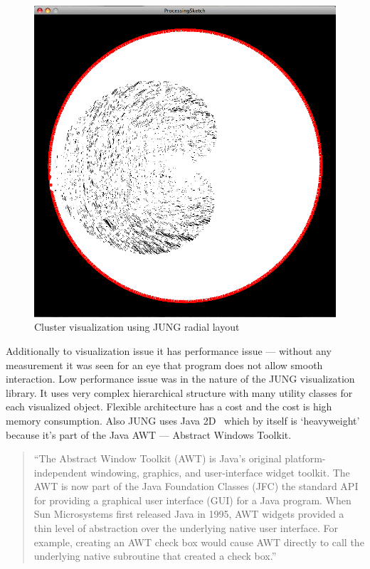 \begin{figure}[h!]
\centering
\includegraphics[scale=0.4]{pictures/using_JUNG_radial.png}
\caption{Cluster visualization using JUNG radial layout}
\label{fig:JUNG_radial_layout}
\end{figure}


Additionally to visualization issue it has performance issue ---
without any measurement it was seen for an eye that program does not allow smooth interaction.
Low performance issue was in the nature of the JUNG visualization library.
It uses very complex hierarchical structure with many utility classes for each visualized object.
Flexible architecture has a cost and the cost is high memory consumption.
Also JUNG uses Java 2D~\cite{JAVA_2D} which by itself is `heavyweight' because it's part of the Java AWT --- Abstract Windows Toolkit.

\begin{quotation}
``The Abstract Window Toolkit (AWT) is Java's original platform-independent windowing, graphics, and user-interface widget toolkit.
The AWT is now part of the Java Foundation Classes (JFC) the standard API for providing a graphical user interface (GUI) for a Java program.
When Sun Microsystems first released Java in 1995, AWT widgets provided a thin level of abstraction over the underlying native user interface.
For example, creating an AWT check box would cause AWT directly to call the underlying native subroutine that created a check box.''~\cite{JAVA_AWT}
\end{quotation}

